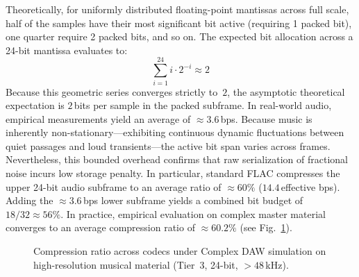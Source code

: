 \documentclass[10pt,twocolumn]{article}
\begin{document}
Theoretically, for uniformly distributed floating-point mantissas across full scale, half of the samples have their most significant bit active (requiring 1 packed bit), one quarter require 2 packed bits, and so on. The expected bit allocation across a 24-bit mantissa evaluates to:
\begin{equation}
	\sum_{i=1}^{24} i \cdot 2^{-i} \approx 2
\end{equation}
Because this geometric series converges strictly to~$2$, the asymptotic theoretical expectation is $2$\,bits per sample in the packed subframe. In real-world audio, empirical measurements yield an average of $\approx 3.6$\,bps. Because music is inherently non-stationary---exhibiting continuous dynamic fluctuations between quiet passages and loud transients---the active bit span varies across frames. Nevertheless, this bounded overhead confirms that raw serialization of fractional noise incurs low storage penalty. In particular, standard FLAC compresses the upper 24-bit audio subframe to an average ratio of $\approx 60\%$ ($14.4$\,effective bps). Adding the $\approx 3.6$\,bps lower subframe yields a combined bit budget of $18 / 32 \approx 56\%$. In practice, empirical evaluation on complex master material converges to an average compression ratio of $\approx 60.2\%$ (see Fig.~\ref{fig:chart_daw}).

\begin{figure}[!ht]
	\centering
	\caption{Compression ratio across codecs under Complex DAW simulation on high-resolution musical material (Tier~3, 24-bit, $>48$\,kHz).}
	\label{fig:chart_daw}
\end{figure}
\end{document}
